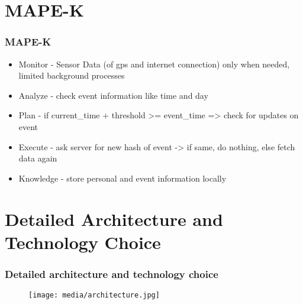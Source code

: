 \documentclass[aspectratio=169]{beamer}
\begin{document}
\section{MAPE-K}
\begin{frame}   
	\frametitle{MAPE-K}
	\begin{itemize}
		\item Monitor - Sensor Data (of gps and internet connection) only when needed, limited background processes
    		\item Analyze - check event information like time and day 
    		\item Plan - if current\_time + threshold >= event\_time => check for updates on event
    		\item Execute - ask server for new hash of event -> if same, do nothing, else fetch data again
    		\item Knowledge - store personal and event information locally
	\end{itemize}
\end{frame}




\section{Detailed Architecture and Technology Choice}
\begin{frame}
	\frametitle{Detailed architecture and technology choice}
	 \begin{figure}
		\centering
		\texttt{[image: media/architecture.jpg]}
	\end{figure}
\end{frame}
\end{document}
